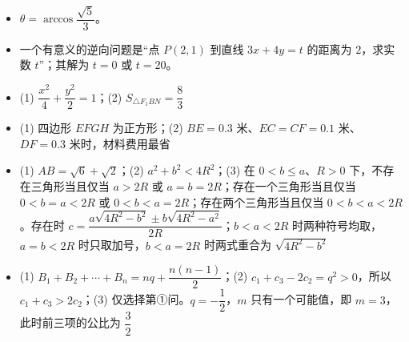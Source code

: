 \begin{itemize}[leftmargin=2.6em]
  \item[\textbf{16.}] $\theta=\arccos\dfrac{\sqrt5}{3}$。
  \item[\textbf{17.}] 一个有意义的逆向问题是“点 $P(2,1)$ 到直线 $3x+4y=t$ 的距离为 $2$，求实数 $t$”；其解为 $t=0$ 或 $t=20$。
  \item[\textbf{18.}] (1) $\dfrac{x^2}{4}+\dfrac{y^2}{2}=1$；(2) $S_{\triangle F_1BN}=\dfrac83$
  \item[\textbf{19.}] (1) 四边形 $EFGH$ 为正方形；(2) $BE=0.3$ 米、$EC=CF=0.1$ 米、$DF=0.3$ 米时，材料费用最省
  \item[\textbf{20.}] (1) $AB=\sqrt6+\sqrt2$；(2) $a^2+b^2<4R^2$；(3) 在 $0<b\le a$、$R>0$ 下，不存在三角形当且仅当 $a>2R$ 或 $a=b=2R$；存在一个三角形当且仅当 $0<b=a<2R$ 或 $0<b<a=2R$；存在两个三角形当且仅当 $0<b<a<2R$。存在时 $c=\dfrac{a\sqrt{4R^2-b^2}\pm b\sqrt{4R^2-a^2}}{2R}$；$b<a<2R$ 时两种符号均取，$a=b<2R$ 时只取加号，$b<a=2R$ 时两式重合为 $\sqrt{4R^2-b^2}$
  \item[\textbf{21.}] (1) $B_1+B_2+\cdots+B_n=nq+\dfrac{n(n-1)}2$；(2) $c_1+c_3-2c_2=q^2>0$，所以 $c_1+c_3>2c_2$；(3) 仅选择第①问。$q=-\dfrac12$，$m$ 只有一个可能值，即 $m=3$，此时前三项的公比为 $\dfrac32$
\end{itemize}
